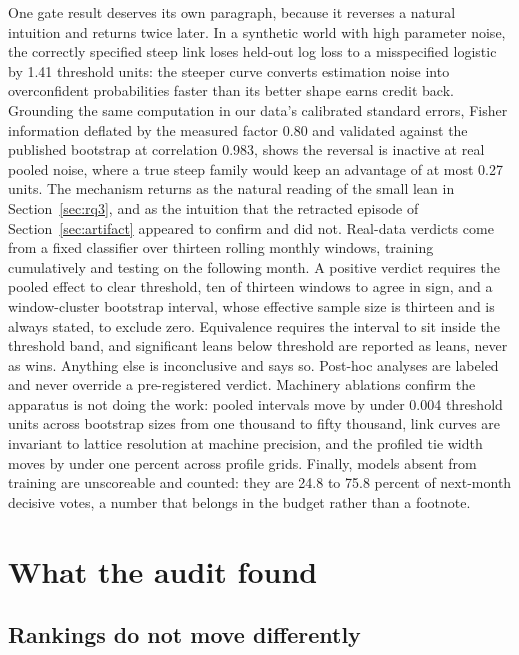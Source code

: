 \documentclass[10pt]{article}
\begin{document}
One gate result deserves its own paragraph, because it reverses a
natural intuition and returns twice later. In a synthetic world with
high parameter noise, the correctly specified steep link loses
held-out log loss to a misspecified logistic by 1.41 threshold units:
the steeper curve converts estimation noise into overconfident
probabilities faster than its better shape earns credit back.
Grounding the same computation in our data's calibrated standard
errors, Fisher information deflated by the measured factor 0.80 and
validated against the published bootstrap at correlation 0.983, shows
the reversal is inactive at real pooled noise, where a true steep
family would keep an advantage of at most 0.27 units. The mechanism
returns as the natural reading of the small lean in
Section~\ref{sec:rq3}, and as the intuition that the retracted
episode of Section~\ref{sec:artifact} appeared to confirm and did
not. Real-data verdicts come from a fixed
classifier over thirteen rolling monthly windows, training
cumulatively and testing on the following month. A positive verdict
requires the pooled effect to clear threshold, ten of thirteen
windows to agree in sign, and a window-cluster bootstrap interval,
whose effective sample size is thirteen and is always stated, to
exclude zero. Equivalence requires the interval to sit inside the
threshold band, and significant leans below threshold are reported as
leans, never as wins. Anything else is inconclusive and says so.
Post-hoc analyses are labeled and never override a pre-registered
verdict. Machinery ablations confirm the apparatus is not doing the
work: pooled intervals move by under 0.004 threshold units across
bootstrap sizes from one thousand to fifty thousand, link curves are
invariant to lattice resolution at machine precision, and the
profiled tie width moves by under one percent across profile grids.
Finally, models absent from training are unscoreable and counted:
they are 24.8 to 75.8 percent of next-month decisive votes, a number
that belongs in the budget rather than a footnote.

\section{What the audit found}\label{sec:results}

\subsection{Rankings do not move differently}\label{sec:rq1}
\end{document}

